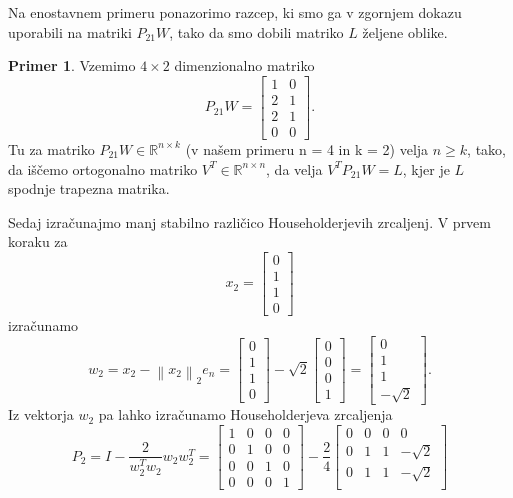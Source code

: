 \documentclass[mat1]{article}
\newcommand{\norm}[1]{\left\lVert#1\right\rVert}
\theoremstyle{definition}
\newtheorem{primer}{Primer}[section]
\begin{document}
Na enostavnem primeru ponazorimo razcep, ki smo ga v zgornjem dokazu uporabili na matriki $P_{21}W$, tako da smo dobili matriko $L$ željene oblike.
\begin{primer}
Vzemimo $4 \times 2$ dimenzionalno matriko
$$ 
P_{21}W =
\begin{bmatrix}
1 & 0 \\
2 & 1 \\
2 & 1 \\
0 & 0
\end{bmatrix}
\text{.}
$$
Tu za matriko $P_{21}W \in \mathbb{R}^{n \times k}$ (v našem primeru n = 4 in k = 2) velja $n \geq k$, tako, da iščemo ortogonalno matriko $V^T \in \mathbb{R}^{n \times n}$, da velja $V^T P_{21} W = L$, kjer je $L$ spodnje trapezna matrika.

Sedaj izračunajmo manj stabilno različico Householderjevih zrcaljenj. V prvem koraku za
$$ x_2 =
\begin{bmatrix}
0 \\
1 \\
1 \\
0
\end{bmatrix}
$$ 
izračunamo 
$$ w_2 = x_2 - \norm{x_2}_2 e_n =
\begin{bmatrix}
0 \\
1 \\
1 \\
0
\end{bmatrix}
- \sqrt{2} 
\begin{bmatrix}
0 \\
0 \\
0 \\
1
\end{bmatrix} =
\begin{bmatrix}
0 \\
1 \\
1 \\
- \sqrt{2}
\end{bmatrix}
\text{.}
$$ 
Iz vektorja $w_2$ pa lahko izračunamo Householderjeva zrcaljenja
$$
P_2 = I - \frac{2}{w_2^T w_2} w_2 w_2^T = 
\begin{bmatrix}
1 & 0 & 0 & 0 \\
0 & 1 & 0 & 0 \\
0 & 0 & 1 & 0 \\
0 & 0 & 0 & 1
\end{bmatrix} - 
\frac{2}{4}
\begin{bmatrix}
0 & 0 & 0 & 0 \\
0 & 1 & 1 & -\sqrt{2} \\
0 & 1 & 1 & -\sqrt{2} \\

\end{bmatrix}$$
\end{primer}
\end{document}
